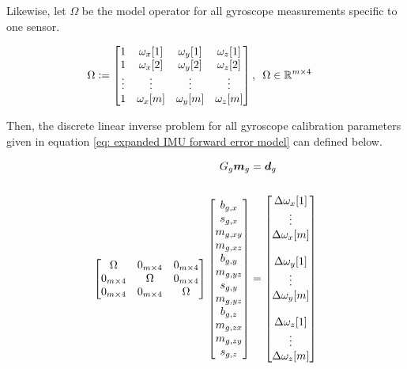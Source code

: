 Likewise, let $\Omega$ be the model operator for all gyroscope measurements specific to one sensor. 

\begin{align} \label{eq: Omega}
	\Omega &\vcentcolon= \begin{bmatrix} 
		1 & \omega_x[1] & \omega_y[1] & \omega_z[1] \\ 1 & \omega_x[2] & \omega_y[2] & \omega_z[2] \\ \vdots & \vdots & \vdots & \vdots \\ 1 & \omega_x[m] & \omega_y[m] & \omega_z[m]
	\end{bmatrix},\,\,\, \Omega \in \mathbb{R}^{m \times 4}
\end{align}

Then, the discrete linear inverse problem for all gyroscope calibration parameters given in equation \ref{eq: expanded IMU forward error model} can defined below.

\begin{align} \label{eq: Gm = d for all gyro parameters}
	G_g \boldsymbol{m}_g &= \boldsymbol{d}_g \notag\\
	\\
	\begin{bmatrix} 
		\Omega & 0_{m \times 4} & 0_{m \times 4} \\
		0_{m \times 4} & \Omega & 0_{m \times 4} \\
		0_{m \times 4} & 0_{m \times 4} & \Omega \\
	\end{bmatrix} \begin{bmatrix}
		b_{g,x} \\ s_{g,x} \\ m_{g,xy} \\ m_{g,xz} \\ b_{g,y} \\ m_{g,yz} \\ s_{g,y} \\ m_{g,yz} \\ b_{g,z} \\ m_{g,zx} \\ m_{g,zy} \\ s_{g,z}
	\end{bmatrix} &= \begin{bmatrix}
		\Delta \omega_x[1] \\ \vdots \\ \Delta \omega_x[m] \\ \\ \Delta \omega_y[1] \\ \vdots \\ \Delta \omega_y[m] \\ \\ \Delta \omega_z[1] \\ \vdots \\ \Delta \omega_z[m]
	\end{bmatrix} \notag
\end{align}


